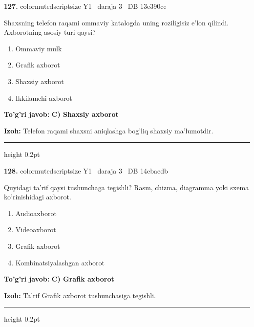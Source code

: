 \documentclass[10pt,a4paper,oneside]{article}
\begin{document}
\noindent\textbf{\color{ink}127.}  {color{muted}scriptsize Y1 \textbullet\ daraja 3 \textbullet\ DB 13e390ce}
\par
Shaxsning telefon raqami ommaviy katalogda uning roziligisiz e'lon qilindi. Axborotning asosiy turi qaysi?
\begin{enumerate}[label=\Alph*),leftmargin=9mm]
\item Ommaviy mulk
\item Grafik axborot
\item Shaxsiy axborot
\item Ikkilamchi axborot
\end{enumerate}
\begin{tcolorbox}[enhanced,breakable,colback=teal!4,colframe=teal!50!black,boxrule=0.5pt,arc=1.1mm,left=3mm,right=3mm,top=1.7mm,bottom=1.7mm,before skip=2mm,after skip=2mm]
\textbf{\color{teal}To'g'ri javob:} \textbf{C) Shaxsiy axborot}
\par\smallskip
\textbf{Izoh:} Telefon raqami shaxsni aniqlashga bog'liq shaxsiy ma'lumotdir.
\end{tcolorbox}
\vspace{2mm}\hrule height 0.2pt \vspace{3mm}

\noindent\textbf{\color{ink}128.}  {color{muted}scriptsize Y1 \textbullet\ daraja 3 \textbullet\ DB 14ebaedb}
\par
Quyidagi ta'rif qaysi tushunchaga tegishli? Rasm, chizma, diagramma yoki sxema ko'rinishidagi axborot.
\begin{enumerate}[label=\Alph*),leftmargin=9mm]
\item Audioaxborot
\item Videoaxborot
\item Grafik axborot
\item Kombinatsiyalashgan axborot
\end{enumerate}
\begin{tcolorbox}[enhanced,breakable,colback=teal!4,colframe=teal!50!black,boxrule=0.5pt,arc=1.1mm,left=3mm,right=3mm,top=1.7mm,bottom=1.7mm,before skip=2mm,after skip=2mm]
\textbf{\color{teal}To'g'ri javob:} \textbf{C) Grafik axborot}
\par\smallskip
\textbf{Izoh:} Ta'rif Grafik axborot tushunchasiga tegishli.
\end{tcolorbox}
\vspace{2mm}\hrule height 0.2pt \vspace{3mm}
\end{document}
